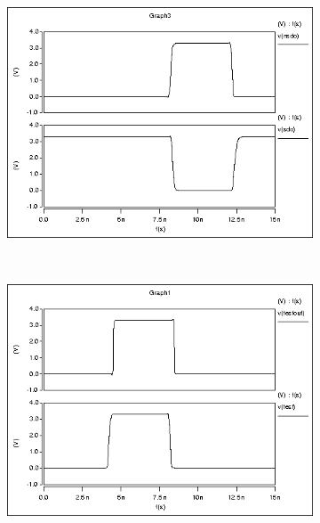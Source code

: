 \begin{figure}[ht!]
\begin{subfigure}[b]{0.45\textwidth}
        \end{subfigure} 
		~ %
        \begin{subfigure}[b]{0.45\textwidth}
                \includegraphics[width=\textwidth]{../leftbuf/hspiceSDO.png}
        \end{subfigure} 
		~ %
        \begin{subfigure}[b]{0.45\textwidth}
                \includegraphics[width=\textwidth]{../leftbuf/hspiceTest.png}
        \end{subfigure}
\end{figure}
